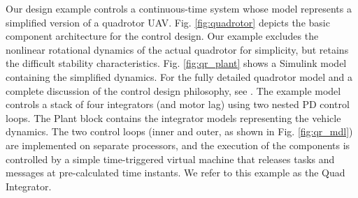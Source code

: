 Our design example controls a continuous-time system whose model represents a simplified 
version of a quadrotor UAV.  Fig. \ref{fig:quadrotor} depicts the basic
component architecture for the control design.  Our example excludes the
nonlinear rotational dynamics of the actual quadrotor for simplicity, but
retains the difficult stability characteristics. Fig. \ref{fig:qr_plant} shows
a Simulink model containing the simplified dynamics. For the fully detailed
quadrotor model and a complete discussion of the control design philosophy, see
\cite{quad:passcontrol}. The example model controls a stack of four
integrators (and motor lag) using two nested PD control loops.
The Plant block contains the integrator models representing the vehicle dynamics. The two control loops (inner and outer, as shown in Fig. \ref{fig:qr_mdl}) are
implemented on separate processors, and the execution of the components is
controlled by a simple time-triggered virtual machine that releases tasks and
messages at pre-calculated time instants.  We refer to this example as the Quad Integrator.

% 





